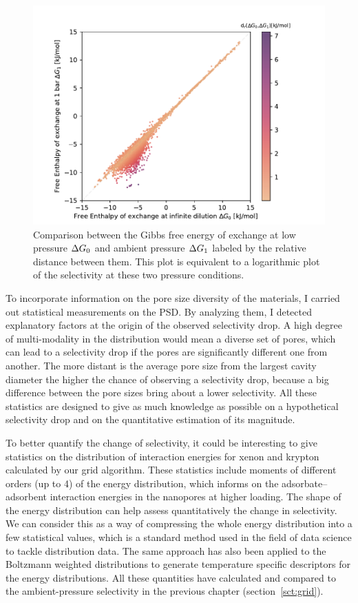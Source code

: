 \documentclass[main]{subfiles}
\begin{document}
\begin{figure}[ht]
\centering
  \includegraphics[width=0.5\linewidth]{figures/4-ml/main/Scatterplot_G1_G0.pdf}
  \caption{Comparison between the Gibbs free energy of exchange at low pressure $\Delta G_{\text{0}}$ and ambient pressure $\Delta G_{\text{1}}$ labeled by the relative distance between them. This plot is equivalent to a logarithmic plot of the selectivity at these two pressure conditions.}
  \label{fgr:problem}
\end{figure}

To incorporate information on the pore size diversity of the materials, I carried out statistical measurements on the PSD. By analyzing them, I detected explanatory factors at the origin of the observed selectivity drop. A high degree of multi-modality in the distribution would mean a diverse set of pores, which can lead to a selectivity drop if the pores are significantly different one from another. The more distant is the average pore size from the largest cavity diameter the higher the chance of observing a selectivity drop, because a big difference between the pore sizes bring about a lower selectivity. All these statistics are designed to give as much knowledge as possible on a hypothetical selectivity drop and on the quantitative estimation of its magnitude.

To better quantify the change of selectivity, it could be interesting to give statistics on the distribution of interaction energies for xenon and krypton calculated by our grid algorithm. These statistics include moments of different orders (up to 4) of the energy distribution, which informs on the adsorbate--adsorbent interaction energies in the nanopores at higher loading. The shape of the energy distribution can help assess quantitatively the change in selectivity. We can consider this as a way of compressing the whole energy distribution into a few statistical values, which is a standard method used in the field of data science to tackle distribution data. The same approach has also been applied to the Boltzmann weighted distributions to generate temperature specific descriptors for the energy distributions. All these quantities have calculated and compared to the ambient-pressure selectivity in the previous chapter (section~\ref{sct:grid}).
\end{document}
